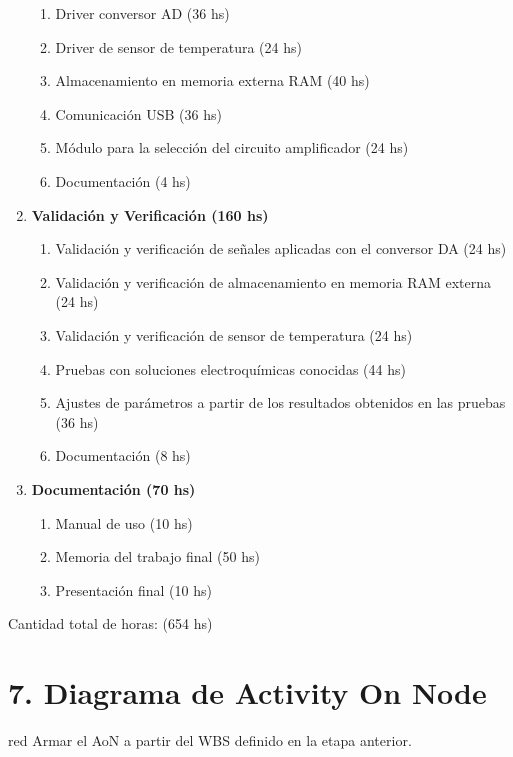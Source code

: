 \documentclass[11pt]{charter}
\begin{document}
\begin{enumerate}
\begin{enumerate}
		\item Driver conversor AD (36 hs)
		\item Driver de sensor de temperatura (24 hs)
		\item Almacenamiento en memoria externa RAM (40 hs)
		\item Comunicación USB (36 hs)
		\item Módulo para la selección del circuito amplificador (24 hs)	
		\item Documentación (4 hs)
	\end{enumerate}		
\item \textbf{Validación y Verificación (160 hs)}
	\begin{enumerate}
		\item Validación y verificación de señales aplicadas con el conversor DA (24 hs)
		\item Validación y verificación de almacenamiento en memoria RAM externa (24 hs)
		\item Validación y verificación de sensor de temperatura (24 hs)
		\item Pruebas con soluciones electroquímicas conocidas (44 hs)
		\item Ajustes de parámetros a partir de los resultados obtenidos en las pruebas (36 hs)
		\item Documentación (8 hs)
	\end{enumerate}
\item \textbf{Documentación (70 hs)}
	\begin{enumerate}
		\item Manual de uso (10 hs)
		\item Memoria del trabajo final (50 hs)
		\item Presentación final (10 hs)
	\end{enumerate}
\end{enumerate}

Cantidad total de horas: (654 hs)


\section{7. Diagrama de Activity On Node}
\label{sec:AoN}

\begin{consigna}{red}
Armar el AoN a partir del WBS definido en la etapa anterior. 



\end{consigna}
\end{document}
